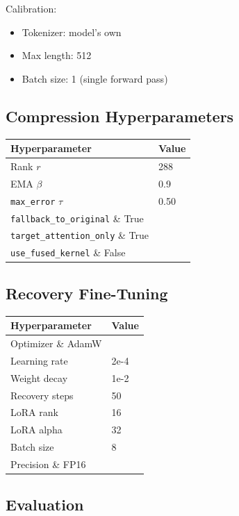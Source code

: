 Calibration:
\begin{itemize}
\item Tokenizer: model's own
\item Max length: 512
\item Batch size: 1 (single forward pass)

\end{itemize}
\subsection{Compression Hyperparameters}

\begin{table}[H]
\centering
\small
\begin{tabular}{ll}
\toprule
\textbf{Hyperparameter} & \textbf{Value} \\
\midrule
Rank $r$ & 288 \\
EMA $\beta$ & 0.9 \\
\texttt{max\_error} $\tau$ & 0.50 \\
\texttt{fallback\_to\_original} \& True \\
\texttt{target\_attention\_only} \& True \\
\texttt{use\_fused\_kernel} \& False \\
\bottomrule
\end{tabular}
\end{table}

\subsection{Recovery Fine-Tuning}

\begin{table}[H]
\centering
\small
\begin{tabular}{ll}
\toprule
\textbf{Hyperparameter} & \textbf{Value} \\
\midrule
Optimizer \& AdamW \\
Learning rate & 2e-4 \\
Weight decay & 1e-2 \\
Recovery steps & 50 \\
LoRA rank & 16 \\
LoRA alpha & 32 \\
Batch size & 8 \\
Precision \& FP16 \\
\bottomrule
\end{tabular}
\end{table}

\subsection{Evaluation}

